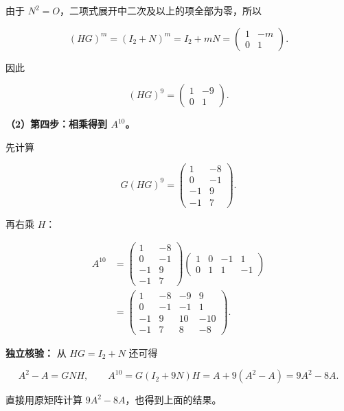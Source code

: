 \documentclass[UTF8,11pt,fontset=windows]{ctexart}
\begin{document}
由于 $N^2=O$，二项式展开中二次及以上的项全部为零，所以

$$
(HG)^m=(I_2+N)^m=I_2+mN
=\begin{pmatrix}1&-m\\0&1\end{pmatrix}.
$$

因此

$$
(HG)^9=\begin{pmatrix}1&-9\\0&1\end{pmatrix}.
$$

\textbf{（2）第四步：相乘得到 $A^{10}$。}

先计算

$$
G(HG)^9
=\begin{pmatrix}
1&-8\\
0&-1\\
-1&9\\
-1&7
\end{pmatrix}.
$$

再右乘 $H$：

$$
\begin{aligned}
A^{10}
&=\begin{pmatrix}1&-8\\0&-1\\-1&9\\-1&7\end{pmatrix}
\begin{pmatrix}1&0&-1&1\\0&1&1&-1\end{pmatrix}\\
&=\boxed{\begin{pmatrix}
1&-8&-9&9\\
0&-1&-1&1\\
-1&9&10&-10\\
-1&7&8&-8
\end{pmatrix}}.
\end{aligned}
$$

\textbf{独立核验：} 从 $HG=I_2+N$ 还可得

$$
A^2-A=GNH,
\qquad
A^{10}=G(I_2+9N)H=A+9(A^2-A)=9A^2-8A.
$$

直接用原矩阵计算 $9A^2-8A$，也得到上面的结果。
\end{document}
